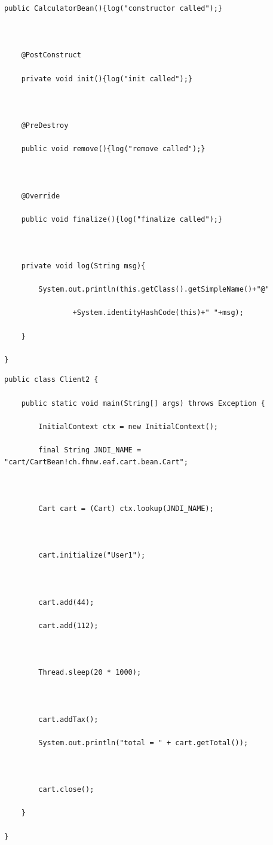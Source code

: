 \documentclass[a4paper,10pt]{scrreprt}
\begin{document}
\begin{lstlisting}[caption=Stateless Bean]
	public CalculatorBean(){log("constructor called");}



	@PostConstruct

	private void init(){log("init called");}



	@PreDestroy

	public void remove(){log("remove called");}



	@Override

	public void finalize(){log("finalize called");}



	private void log(String msg){

		System.out.println(this.getClass().getSimpleName()+"@"

				+System.identityHashCode(this)+" "+msg);

	}

}
\end{lstlisting}
\begin{lstlisting}[caption=Client]
 public class Client2 {

	public static void main(String[] args) throws Exception {

		InitialContext ctx = new InitialContext();

		final String JNDI_NAME = "cart/CartBean!ch.fhnw.eaf.cart.bean.Cart";



		Cart cart = (Cart) ctx.lookup(JNDI_NAME);



		cart.initialize("User1");



		cart.add(44);

		cart.add(112);



		Thread.sleep(20 * 1000);



		cart.addTax();

		System.out.println("total = " + cart.getTotal());



		cart.close();

	}

}
\end{lstlisting}
\end{document}

